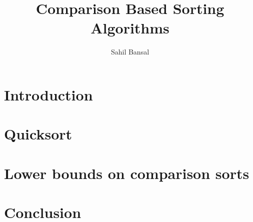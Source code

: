 \documentclass[a4paper, 10pt,twocolumn]{article}
\title{Comparison Based Sorting Algorithms}
\author{Sahil Bansal}
\date{}
\begin{document}
\maketitle
\begin{abstract}

\end{abstract}
\section{Introduction}

\section{Quicksort}

\section{Lower bounds on comparison sorts}

\section{Conclusion}



\end{document}
